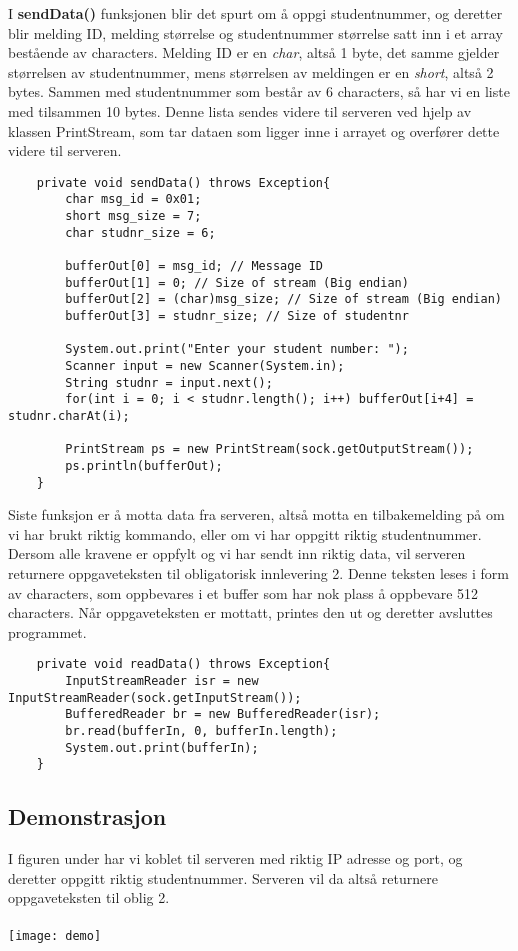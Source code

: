 I \textbf{sendData()} funksjonen blir det spurt om å oppgi studentnummer, og deretter blir melding ID, melding størrelse og studentnummer størrelse satt inn i et array bestående av characters. Melding ID er en \textit{char}, altså 1 byte, det samme gjelder størrelsen av studentnummer, mens størrelsen av meldingen er en \textit{short}, altså 2 bytes. Sammen med studentnummer som består av 6 characters, så har vi en liste med tilsammen 10 bytes. Denne lista sendes videre til serveren ved hjelp av klassen PrintStream, som tar dataen som ligger inne i arrayet og overfører dette videre til serveren.
\begin{lstlisting}
	private void sendData() throws Exception{
		char msg_id = 0x01;
		short msg_size = 7;
		char studnr_size = 6;

		bufferOut[0] = msg_id; // Message ID
		bufferOut[1] = 0; // Size of stream (Big endian)
		bufferOut[2] = (char)msg_size; // Size of stream (Big endian)
		bufferOut[3] = studnr_size; // Size of studentnr
		
		System.out.print("Enter your student number: ");
		Scanner input = new Scanner(System.in);
		String studnr = input.next();
		for(int i = 0; i < studnr.length(); i++) bufferOut[i+4] = studnr.charAt(i);
		
		PrintStream ps = new PrintStream(sock.getOutputStream());
		ps.println(bufferOut);
	}
\end{lstlisting}

Siste funksjon er å motta data fra serveren, altså motta en tilbakemelding på om vi har brukt riktig kommando, eller om vi har oppgitt riktig studentnummer. Dersom alle kravene er oppfylt og vi har sendt inn riktig data, vil serveren returnere oppgaveteksten til obligatorisk innlevering 2. Denne teksten leses i form av characters, som oppbevares i et buffer som har nok plass å oppbevare 512 characters. Når oppgaveteksten er mottatt, printes den ut og deretter avsluttes programmet.
\begin{lstlisting}
	private void readData() throws Exception{
		InputStreamReader isr = new InputStreamReader(sock.getInputStream());
		BufferedReader br = new BufferedReader(isr);
		br.read(bufferIn, 0, bufferIn.length);
		System.out.print(bufferIn);
	}
\end{lstlisting}

\subsection{Demonstrasjon}
I figuren under har vi koblet til serveren med riktig IP adresse og port, og deretter oppgitt riktig studentnummer. Serveren vil da altså returnere oppgaveteksten til oblig 2.\\\\
\texttt{[image: demo]}
